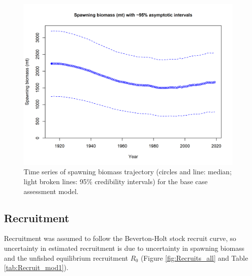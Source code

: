 \documentclass[12pt,]{article}
\begin{document}
\FloatBarrier

\begin{figure}
\centering
\includegraphics{r4ss/plots_mod1/ts7_Spawning_biomass_(mt)_with_95_asymptotic_intervals_intervals.png}
\caption{Time series of spawning biomass trajectory (circles and line:
median; light broken lines: 95\% credibility intervals) for the base
case assessment model. \label{fig:Spawnbio_all}}
\end{figure}

\FloatBarrier

\hypertarget{recruitment}{%
\subsection*{Recruitment}\label{recruitment}}

Recruitment was assumed to follow the Beverton-Holt stock recruit curve,
so uncertainty in estimated recruitment is due to uncertainty in
spawning biomass and the unfished equilibrium recruitment \(R_0\)
(Figure \ref{fig:Recruits_all} and Table \ref{tab:Recruit_mod1}).

\vspace{.5cm}
\end{document}
